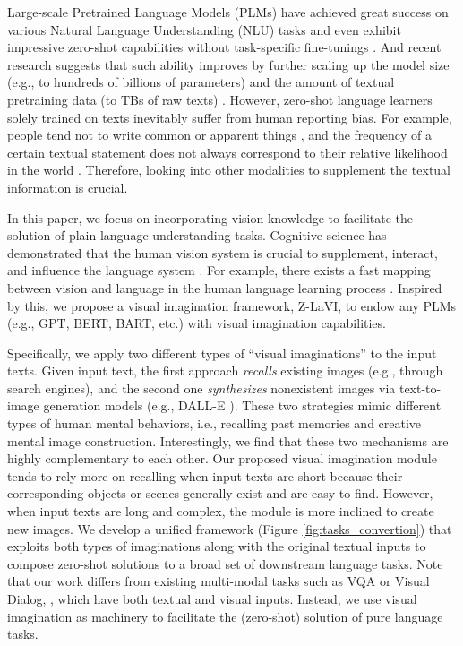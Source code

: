 \documentclass[11pt]{article}
\newcommand{\model}{Z-LaVI}
\begin{document}
Large-scale Pretrained Language Models (PLMs) have achieved great success on various Natural Language Understanding (NLU) tasks and even exhibit impressive zero-shot capabilities  without task-specific fine-tunings \cite{radford2019language}. And recent research suggests that such ability improves by further scaling up the model size (e.g., to hundreds of billions of parameters) and the amount of textual pretraining data (to TBs of raw texts) \citep{min2021recent,brown2020language,chowdhery2022palm,kaplan2020scaling}.
However, zero-shot language learners solely trained on texts inevitably suffer from human reporting bias. For example, people tend not to write common or apparent things \citep{grice1975logic}, and the frequency of a certain textual statement does not always correspond to their relative likelihood in the world \citep{gordon2013reporting}.  
Therefore, looking into other modalities to supplement the textual information is crucial.


In this paper, we focus on incorporating vision knowledge to facilitate the solution of plain language understanding tasks. Cognitive science has demonstrated that the human vision system is crucial to supplement, interact, and influence the language system \citep{dessalegn2013interaction}. For example, there exists a fast mapping between vision and language in the human language learning process \citep{altmann2004now}.
Inspired by this, we propose a visual imagination framework, \model, to endow any PLMs (e.g., GPT, BERT, BART, etc.) with visual imagination capabilities. 

Specifically, we apply two different types of ``visual imaginations'' to the input texts. Given input text, the first approach \emph{recalls} existing images (e.g., through search engines), and the second one \emph{synthesizes} nonexistent images via text-to-image generation models (e.g., DALL-E \citep{ramesh2021zero}). These two strategies mimic different types of human mental behaviors, i.e., recalling past memories and creative mental image construction. Interestingly, we find that these two mechanisms are highly complementary to each other. 
Our proposed visual imagination module tends to rely more on recalling when input texts are short because their corresponding objects or scenes generally exist and are easy to find. However, when input texts are long and complex, the module is more inclined to create new images.
We develop a unified framework (Figure \ref{fig:tasks_convertion}) that exploits both types of imaginations along with the original textual inputs to compose zero-shot solutions to a broad set of downstream language tasks. Note that our work differs from existing multi-modal tasks such as VQA \citep{antol2015vqa, wu2017visual} or Visual Dialog, \citep{das2017visual}, which have both textual and visual inputs. Instead, we use visual imagination as machinery to facilitate the (zero-shot) solution of pure language tasks.
\end{document}
